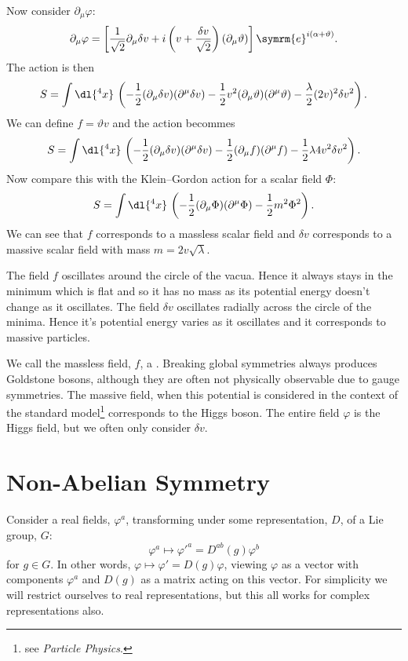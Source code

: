 \documentclass[fleqn]{NotesClass}
\newcommand{\course}[1]{\textit{#1}}
\newcommand{\e}{\symrm{e}}
\begin{document}
    Now consider \(\partial_\mu \varphi\):
    \begin{equation}
        \partial_\mu \varphi = \left[ \frac{1}{\sqrt{2}}\partial_\mu \delta v + i\left( v + \frac{\delta v}{\sqrt{2}} \right)(\partial_\mu \vartheta) \right] \e^{i(\alpha + \vartheta)}.
    \end{equation}
    The action is then
    \begin{equation}
        S = \int \dl{^4x} \, \left( -\frac{1}{2}(\partial_\mu \delta v)(\partial^\mu \delta v) - \frac{1}{2} v^2 (\partial_\mu \vartheta)(\partial^\mu \vartheta) - \frac{\lambda}{2} (2v)^2 \delta v^2 \right).
    \end{equation}
    We can define \(f = \vartheta v\) and the action becommes
    \begin{equation}
        S = \int \dl{^4x} \, \left( -\frac{1}{2}(\partial_\mu \delta v)(\partial^\mu \delta v) - \frac{1}{2}(\partial_\mu f)(\partial^\mu f) -\frac{1}{2} \lambda 4v^2 \delta v^2 \right).
    \end{equation}
    Now compare this with the Klein--Gordon action for a scalar field \(\Phi\):
    \begin{equation}
        S = \int \dl{^4x} \, \left( -\frac{1}{2}(\partial_\mu \Phi)(\partial^\mu \Phi) - \frac{1}{2}m^2 \Phi^2 \right).
    \end{equation}
    We can see that \(f\) corresponds to a massless scalar field and \(\delta v\) corresponds to a massive scalar field with mass \(m = 2v\sqrt{\lambda}\).
    
    The field \(f\) oscillates around the circle of the vacua.
    Hence it always stays in the minimum which is flat and so it has no mass as its potential energy doesn't change as it oscillates.
    The field \(\delta v\) oscillates radially across the circle of the minima.
    Hence it's potential energy varies as it oscillates and it corresponds to massive particles.
    
    We call the massless field, \(f\), a .
    Breaking global symmetries always produces Goldstone bosons, although they are often not physically observable due to gauge symmetries.
    The massive field, when this potential is considered in the context of the standard model\footnote{see \course{Particle Physics}.} corresponds to the Higgs boson.
    The entire field \(\varphi\) is the Higgs field, but we often only consider \(\delta v\).
    
    \section{Non-Abelian Symmetry}
    Consider a real fields, \(\varphi^a\), transforming under some representation, \(D\), of a Lie group, \(G\):
    \begin{equation}
        \varphi^a \mapsto \varphi'^a = D^{ab}(g)\varphi^b
    \end{equation}
    for \(g \in G\).
    In other words, \(\varphi \mapsto \varphi' = D(g)\varphi\), viewing \(\varphi\) as a vector with components \(\varphi^a\) and \(D(g)\) as a matrix acting on this vector.
    For simplicity we will restrict ourselves to real representations, but this all works for complex representations also.
    
\end{document}
